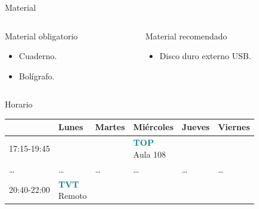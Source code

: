 \documentclass{beamer}
\begin{document}
\begin{frame}{Material}
    \begin{columns}
        \begin{column}[t]{0.5\textwidth}
            \begin{block}{Material obligatorio}
                \begin{itemize}
                    \item Cuaderno.
                    \item Bolígrafo.
                \end{itemize}
            \end{block}
        \end{column}
        \begin{column}[t]{0.5\textwidth}
            \begin{block}{Material recomendado}
                \begin{itemize}
                    \item Disco duro externo USB.
                \end{itemize}
            \end{block}
        \end{column}
    \end{columns}
\end{frame}

\begin{frame}{Horario}
    \begin{tabular}{|l|l|l|l|l|l|}
        \hline
         & Lunes & Martes & Miércoles & Jueves & Viernes\\
        \hline        
        17:15-19:45 &
        &
        &
        \makecell{
            {\scriptsize \textcolor{teal}{\textbf{TOP}}\footnotemark[2]}\\
            {\scriptsize Aula 108}
        } &
        &\\
        \hline
        \ldots & \ldots & \ldots & \ldots & \ldots & \ldots\\
        \hline
        20:40-22:00 &
        \makecell{
            {\scriptsize \textcolor{teal}{\textbf{TVT}}\footnotemark[1]}\\
            {\scriptsize Remoto}
        } &
        &
        &
        &\\
        \hline
    \end{tabular}

\end{frame}
\end{document}
